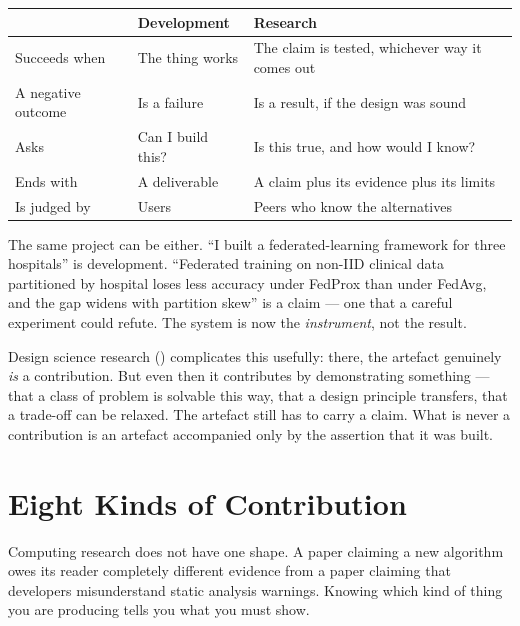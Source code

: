 \begin{center}
\small
\begin{tabular}{@{}L{3.4cm}L{5.4cm}L{5.4cm}@{}}
\toprule
 & \textbf{Development} & \textbf{Research} \\
\midrule
Succeeds when      & The thing works
                   & The claim is tested, whichever way it comes out \\
A negative outcome & Is a failure
                   & Is a result, if the design was sound \\
Asks               & Can I build this?
                   & Is this true, and how would I know? \\
Ends with          & A deliverable
                   & A claim plus its evidence plus its limits \\
Is judged by       & Users
                   & Peers who know the alternatives \\
\bottomrule
\end{tabular}
\end{center}

The same project can be either. ``I built a federated-learning framework for
three hospitals'' is development. ``Federated training on non-IID clinical data
partitioned by hospital loses less accuracy under FedProx than under FedAvg,
and the gap widens with partition skew'' is a claim --- one that a careful
experiment could refute. The system is now the \emph{instrument}, not the
result.

\begin{conceptbox}
Design science research () complicates this usefully: there,
the artefact genuinely \emph{is} a contribution. But even then it contributes
by demonstrating something --- that a class of problem is solvable this way,
that a design principle transfers, that a trade-off can be relaxed. The
artefact still has to carry a claim. What is never a contribution is an
artefact accompanied only by the assertion that it was built.
\end{conceptbox}

\section{Eight Kinds of Contribution}

Computing research does not have one shape. A paper claiming a new algorithm
owes its reader completely different evidence from a paper claiming that
developers misunderstand static analysis warnings. Knowing which kind of thing
you are producing tells you what you must show.

